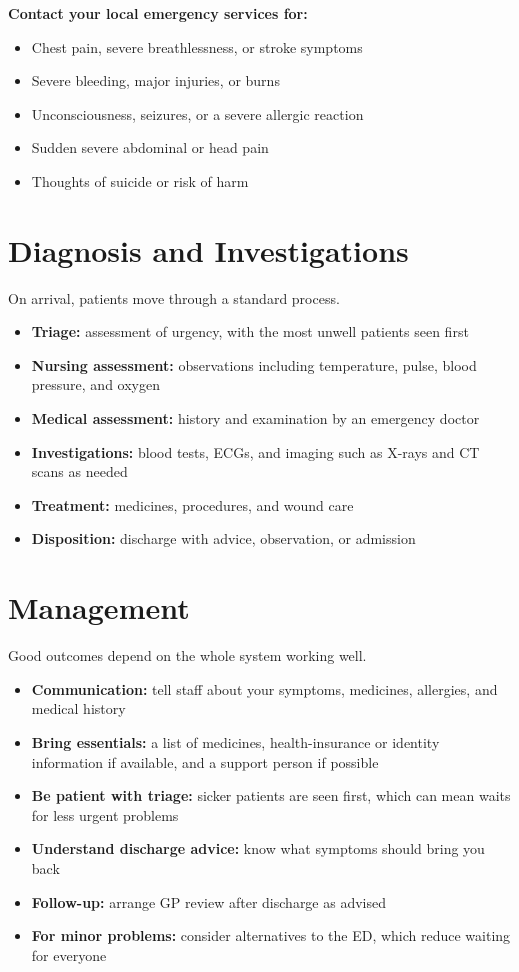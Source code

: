 \textbf{Contact your local emergency services for:}
\begin{itemize}
    \item Chest pain, severe breathlessness, or stroke symptoms
    \item Severe bleeding, major injuries, or burns
    \item Unconsciousness, seizures, or a severe allergic reaction
    \item Sudden severe abdominal or head pain
    \item Thoughts of suicide or risk of harm
\end{itemize}

\section*{Diagnosis and Investigations}
On arrival, patients move through a standard process.
\begin{itemize}
    \item \textbf{Triage:} assessment of urgency, with the most unwell patients seen first
    \item \textbf{Nursing assessment:} observations including temperature, pulse, blood pressure, and oxygen
    \item \textbf{Medical assessment:} history and examination by an emergency doctor
    \item \textbf{Investigations:} blood tests, ECGs, and imaging such as X-rays and CT scans as needed
    \item \textbf{Treatment:} medicines, procedures, and wound care
    \item \textbf{Disposition:} discharge with advice, observation, or admission
\end{itemize}

\section*{Management}
Good outcomes depend on the whole system working well.
\begin{itemize}
    \item \textbf{Communication:} tell staff about your symptoms, medicines, allergies, and medical history
    \item \textbf{Bring essentials:} a list of medicines, health-insurance or identity information if available, and a support person if possible
    \item \textbf{Be patient with triage:} sicker patients are seen first, which can mean waits for less urgent problems
    \item \textbf{Understand discharge advice:} know what symptoms should bring you back
    \item \textbf{Follow-up:} arrange GP review after discharge as advised
    \item \textbf{For minor problems:} consider alternatives to the ED, which reduce waiting for everyone
\end{itemize}

